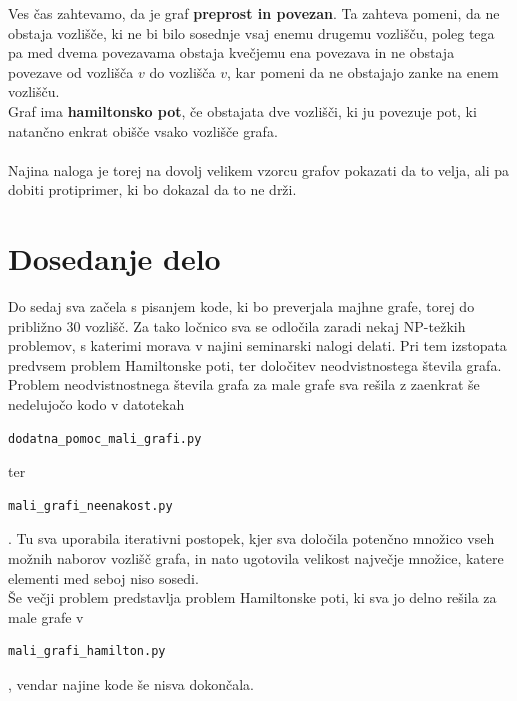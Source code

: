 \documentclass[12pt,a4paper]{amsart}
\begin{document}
Ves čas zahtevamo, da je graf \textbf{preprost in povezan}. Ta zahteva pomeni, da ne obstaja vozlišče, ki ne bi bilo sosednje vsaj enemu drugemu vozlišču, poleg tega pa med dvema povezavama obstaja kvečjemu ena povezava in ne obstaja  povezave od vozlišča $v$ do vozlišča $v$, kar pomeni da ne obstajajo zanke na enem vozlišču.\\
 
Graf ima \textbf{hamiltonsko pot}, če obstajata dve vozlišči, ki ju povezuje pot, ki natančno enkrat obišče vsako vozlišče grafa.\\
\ \\
Najina naloga je torej na dovolj velikem vzorcu grafov pokazati da to velja, ali pa dobiti protiprimer, ki bo dokazal da to ne drži.\\
\section{Dosedanje delo}
Do sedaj sva začela s pisanjem kode, ki bo preverjala majhne grafe, torej do približno $30$ vozlišč. Za tako ločnico sva se odločila zaradi nekaj NP-težkih problemov, s katerimi morava v najini seminarski nalogi delati. Pri tem izstopata predvsem problem Hamiltonske poti, ter določitev neodvistnostega števila grafa. \\
Problem neodvistnostnega števila grafa za male grafe sva rešila z zaenkrat še nedelujočo kodo v datotekah \begin{verbatim}dodatna_pomoc_mali_grafi.py\end{verbatim} ter \begin{verbatim}mali_grafi_neenakost.py\end{verbatim}. Tu sva uporabila iterativni postopek, kjer sva določila potenčno množico vseh možnih naborov vozlišč grafa, in nato ugotovila velikost največje množice, katere elementi med seboj niso sosedi.\\
Še večji problem predstavlja problem Hamiltonske poti, ki sva jo delno rešila za male grafe v \begin{verbatim}mali_grafi_hamilton.py\end{verbatim}, vendar najine kode še nisva dokončala.  \\
\end{document}
